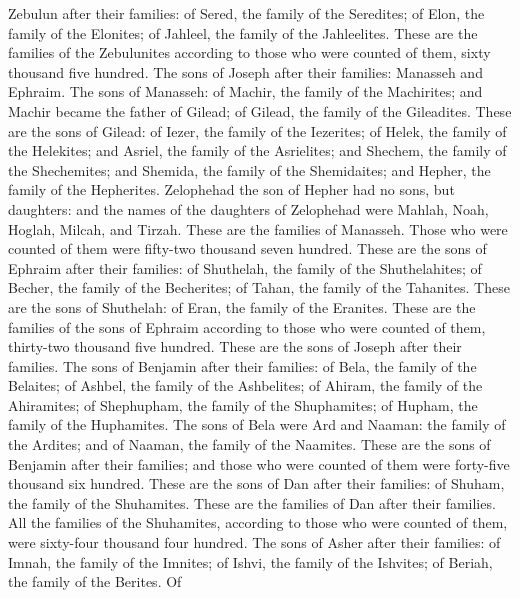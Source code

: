 Zebulun after their families: of Sered, the family of the Seredites; of
Elon, the family of the Elonites; of Jahleel, the family of the
Jahleelites.  These are the families of the Zebulunites
according to those who were counted of them, sixty thousand five
hundred.  The sons of Joseph after their families:
Manasseh and Ephraim.  The sons of Manasseh: of Machir,
the family of the Machirites; and Machir became the father of Gilead; of
Gilead, the family of the Gileadites.  These are the sons
of Gilead: of Iezer, the family of the Iezerites; of Helek, the family
of the Helekites;  and Asriel, the family of the
Asrielites; and Shechem, the family of the Shechemites; 
and Shemida, the family of the Shemidaites; and Hepher, the family of
the Hepherites.  Zelophehad the son of Hepher had no
sons, but daughters: and the names of the daughters of Zelophehad were
Mahlah, Noah, Hoglah, Milcah, and Tirzah.  These are the
families of Manasseh. Those who were counted of them were fifty-two
thousand seven hundred.  These are the sons of Ephraim
after their families: of Shuthelah, the family of the Shuthelahites; of
Becher, the family of the Becherites; of Tahan, the family of the
Tahanites.  These are the sons of Shuthelah: of Eran, the
family of the Eranites.  These are the families of the
sons of Ephraim according to those who were counted of them, thirty-two
thousand five hundred. These are the sons of Joseph after their
families.  The sons of Benjamin after their families: of
Bela, the family of the Belaites; of Ashbel, the family of the
Ashbelites; of Ahiram, the family of the Ahiramites;  of
Shephupham, the family of the Shuphamites; of Hupham, the family of the
Huphamites.  The sons of Bela were Ard and Naaman: the
family of the Ardites; and of Naaman, the family of the Naamites.
 These are the sons of Benjamin after their families; and
those who were counted of them were forty-five thousand six hundred.
 These are the sons of Dan after their families: of
Shuham, the family of the Shuhamites. These are the families of Dan
after their families.  All the families of the
Shuhamites, according to those who were counted of them, were sixty-four
thousand four hundred.  The sons of Asher after their
families: of Imnah, the family of the Imnites; of Ishvi, the family of
the Ishvites; of Beriah, the family of the Berites.  Of
